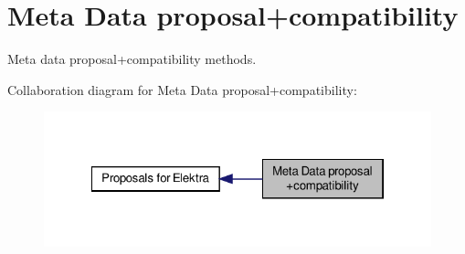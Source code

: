 \hypertarget{group__meta}{\section{Meta Data proposal+compatibility}
\label{group__meta}
}


Meta data proposal+compatibility methods.  


Collaboration diagram for Meta Data proposal+compatibility\-:
\nopagebreak
\begin{figure}[H]
\begin{center}
\leavevmode
\includegraphics[width=322pt]{group__meta}
\end{center}
\end{figure}
